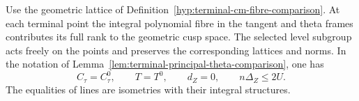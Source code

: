 \begin{auxlemma}
\label{lem:terminal-valuative-realization}
Use the geometric lattice of Definition~\ref{hyp:terminal-cm-fibre-comparison}.
At each terminal point the integral polynomial fibre in the tangent and
theta frames contributes its full rank to the geometric cusp space.
The selected level subgroup acts freely on the points and preserves
the corresponding lattices and norms. In the notation of
Lemma~\ref{lem:terminal-principal-theta-comparison}, one has
\begin{equation}\label{eq:terminal-cm-loss}
 C_\tau=C_\tau^0,\qquad T=T^0,\qquad d_Z=0,\qquad n\Delta_Z\le2U .
\end{equation}
The equalities of lines are isometries with their integral structures.
\end{auxlemma}
